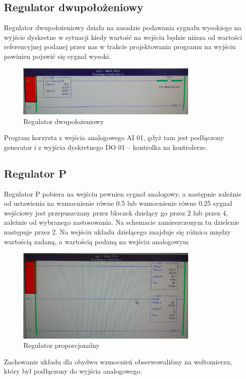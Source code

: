 \documentclass[a4paper, 12pt]{article}
\begin{document}
		\subsection{Regulator dwupołożeniowy}
			Regulator dwupołożeniowy działa na zasadzie podawania sygnału wysokiego na wyjście dyskretne w sytuacji kiedy wartość na wejściu będzie niższa od wartości referencyjnej podanej przez nas w trakcie projektowania programu na wyjściu powinien pojawić się sygnał wysoki.
			\begin{figure}[H]
				\centering
				\includegraphics[width=0.8\textwidth]{./img/dwa_pol.png}
				\caption{Regulator dwupołożeniowy}
			\end{figure}
			\noindent Program korzysta z wejścia analogowego AI 01, gdyż tam jest podłączony generator i z wyjścia dyskretnego DO 01 -- kontrolka na kontrolerze. 
		\subsection{Regulator P}
			Regulator P pobiera na wejściu pewnien sygnał analogowy, a następnie zależnie od ustawienia na wzmocnienie równe 0.5 lub wzmocnienie równe 0.25 sygnał wejściowy jest przepuszczany przez bloczek dzielący go przez 2 lub przez 4, zależnie od wybranego zastosowania. Na schemacie zamieszczonym tu dzielenie następuje przez 2. Na wejściu układu dzielącego znajduje się różnica między wartością zadaną, a wartością podaną na wejściu analogowym
			\begin{figure}[H]
				\centering
				\includegraphics[width=0.8\textwidth]{./img/prop.png}
				\caption{Regulator proporcjonalny}
			\end{figure}
		\noindent Zachowanie układu dla obydwu wzmocnień obserwowaliśmy na woltomierzu, który był podłączony do wyjścia analogowego.
\end{document}

